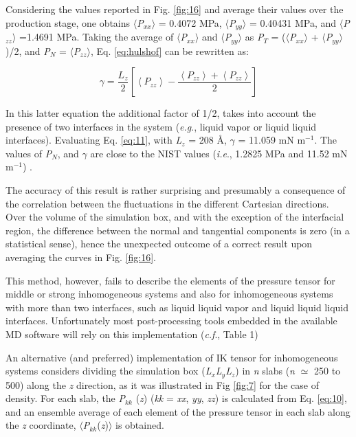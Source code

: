 \documentclass[9pt,bestpractices]{livecoms}
\begin{document}
Considering the values reported in Fig. \ref{fig:16} and average their values
over the production stage, one obtains ${\langle}$\textit{P}$_{xx}$${\rangle}$
= 0.4072 MPa, ${\langle}$\textit{P}$_{yy}$${\rangle}$  = 0.40431 MPa, and
${\langle}$\textit{P}$_{zz}$${\rangle}$ =1.4691 MPa. Taking the average of
${\langle}$\textit{P}$_{xx}$${\rangle}$ and
${\langle}$\textit{P}$_{yy}$${\rangle}$ as \textit{P}$_{T}$
= (${\langle}$\textit{P}$_{xx}$${\rangle}$
+ ${\langle}$\textit{P}$_{yy}$${\rangle}$)/2, and \textit{P}$_{N}$
= ${\langle}$\textit{P}$_{zz}$${\rangle}$, Eq. \ref{eq:hulshof} can be rewritten as:

\begin{equation}
\gamma=\frac{L_{z}}{2}\left[\left\langle P_{zz}\right\rangle -\frac{\left\langle P_{zz}\right\rangle +\left\langle P_{zz}\right\rangle }{2}\right]
  \label{eq:11}
\end{equation}

In this latter equation the additional factor of 1/2, takes into account the
presence of  two interfaces in the system (\textit{e.g}., liquid \textendash{}
vapor or liquid \textendash{} liquid interfaces). Evaluating Eq. \ref{eq:11}, with
\textit{L}$_{z}$ = 208 \AA{}, ${\gamma}$ = 11.059 mN m$^{-1}$. The values of
\textit{P}$_{N}$, and ${\gamma}$ are close to the NIST values (\textit{i.e}.,
1.2825 MPa and 11.52 mN m$^{-1}$) \citep{lemmon2013}.

The accuracy of this result
is rather surprising and presumably a consequence of the correlation between the
fluctuations in the different Cartesian directions. Over the volume of the simulation
box, and with the exception of the interfacial region, the difference between the
normal and tangential components is zero (in a statistical sense), hence the unexpected
outcome of a correct result upon averaging the curves in Fig. \ref{fig:16}.

This method, however, fails to describe the elements of the pressure
tensor for middle or strong inhomogeneous systems and also for inhomogeneous
systems with more than two interfaces, such as liquid \textendash{} liquid
\textendash{} vapor and liquid \textendash{} liquid \textendash{} liquid
interfaces. Unfortunately most post-processing tools embedded in the available MD software
will rely on this implementation (\textit{c.f}., Table 1)

An alternative (and preferred) implementation of IK tensor for inhomogeneous
systems considers dividing the simulation box
(\textit{L}$_{x}$\textit{L}$_{y}$\textit{L}$_{z}$) in \textit{n} slabs
(\textit{n} ${\simeq}$ 250 to 500) along the \textit{z} direction, as it was
illustrated in Fig \ref{fig:7} for the case of density. For each slab, the
\textit{P}$_{kk}$ (\textit{z}) (\textit{kk} = \textit{xx}, \textit{yy},
\textit{zz}) is calculated from Eq. \ref{eq:10}, and an ensemble average of each element
of the pressure tensor in each slab along the \textit{z} coordinate,
${\langle}$\textit{P}$_{kk}$(\textit{z})${\rangle}$ is obtained. 
\end{document}
